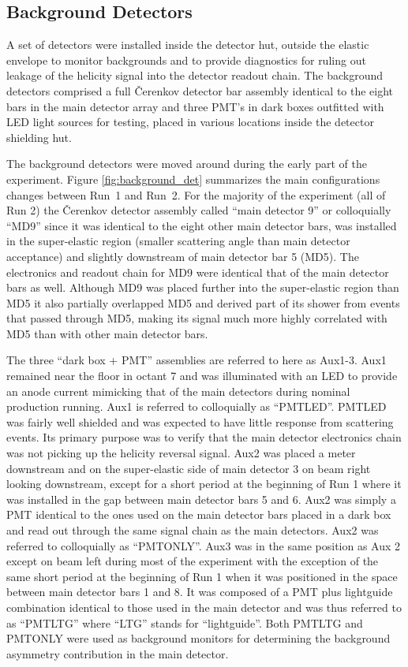 \subsection{Background Detectors}
A set of detectors were installed inside the detector hut, outside the elastic envelope  to monitor backgrounds and to provide diagnostics for ruling out leakage of the helicity signal into the detector readout chain. The background detectors comprised a full \v Cerenkov detector bar assembly identical to the eight bars in the main detector array and three PMT's in dark boxes outfitted with LED light sources for testing, placed in various locations inside the detector shielding hut.

The background detectors were moved around during the early part of the \Qs experiment. Figure \ref{fig:background_det} summarizes the main configurations changes between Run~1 and Run~2. For the majority of the experiment (all of Run 2) the \v Cerenkov detector assembly called ``main detector 9'' or colloquially ``MD9'' since it was identical to the eight other main detector bars, was installed in the super-elastic region (smaller scattering angle than main detector acceptance) and slightly downstream of main detector bar 5 (MD5). The electronics and readout chain for MD9 were identical that of the main detector bars as well. Although MD9 was placed further into the super-elastic region than MD5 it also partially overlapped MD5 and derived part of its shower from events that passed through MD5, making its signal much more highly correlated with MD5 than with other main detector bars. 

The three ``dark box + PMT'' assemblies are referred to here as  Aux1-3. Aux1 remained near the floor in octant 7 and was illuminated with an LED to provide an anode current mimicking that of the main detectors during nominal production running. Aux1 is referred to colloquially as ``PMTLED''. PMTLED was fairly well shielded and was expected to have little response from scattering events. Its primary purpose was to verify that the main detector electronics chain was not picking up the helicity reversal signal. Aux2 was placed a meter downstream and on the super-elastic side of main detector 3 on beam right looking downstream, except for a short period at the beginning of Run 1 where it was installed in the gap between main detector bars 5 and 6. Aux2 was simply a PMT identical to the ones used on the main detector bars placed in a dark box and read out through the same signal chain as the main detectors. Aux2 was referred to colloquially as ``PMTONLY''. Aux3 was in the same position as Aux 2 except on beam left during most of the experiment with the exception of the same short period at the beginning of Run 1 when it was positioned in the space between main detector bars 1 and 8. It was composed of a PMT plus lightguide combination identical to those used in the main detector and was thus referred to as ``PMTLTG'' where ``LTG'' stands for ``lightguide''. Both PMTLTG and PMTONLY were used as background monitors for determining the background asymmetry contribution in the main detector. 


